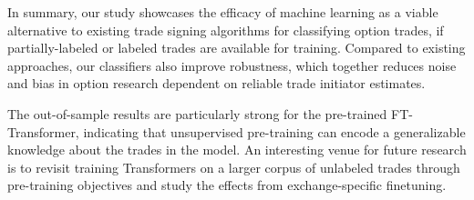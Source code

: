 \documentclass[oneside,a4paper,10pt]{article} %
\begin{document}
In summary, our study showcases the efficacy of machine learning as a viable alternative to existing trade signing algorithms for classifying option trades, if partially-labeled or labeled trades are available for training. Compared to existing approaches, our classifiers also improve robustness, which together reduces noise and bias in option research dependent on reliable trade initiator estimates.

The out-of-sample results are particularly strong for the pre-trained FT-Transformer, indicating that unsupervised pre-training can encode a generalizable knowledge about the trades in the model. An interesting venue for future research is to revisit training Transformers on a larger corpus of unlabeled trades through pre-training objectives and study the effects from exchange-specific finetuning.

\printbibliography
\end{document}
